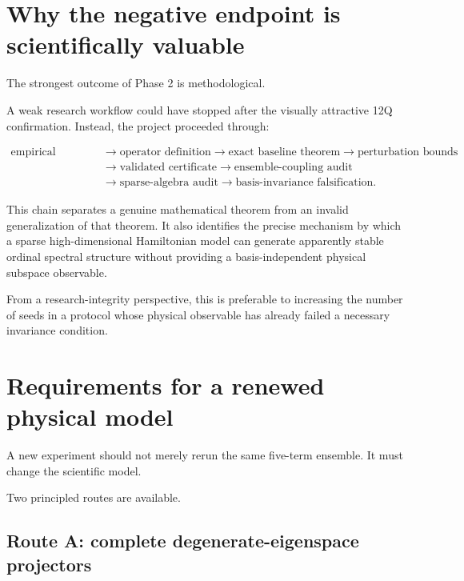 \documentclass[11pt,a4paper]{article}
\begin{document}
\section{Why the negative endpoint is scientifically valuable}

The strongest outcome of Phase 2 is methodological.

A weak research workflow could have stopped after the visually attractive
12Q confirmation.  Instead, the project proceeded through:

\[
\begin{aligned}
\text{empirical recurrence}
&\to \text{operator definition}
\to \text{exact baseline theorem}
\to \text{perturbation bounds}\\
&\to \text{validated certificate}
\to \text{ensemble-coupling audit}\\
&\to \text{sparse-algebra audit}
\to \text{basis-invariance falsification}.
\end{aligned}
\]

This chain separates a genuine mathematical theorem from an invalid
generalization of that theorem.  It also identifies the precise mechanism by
which a sparse high-dimensional Hamiltonian model can generate apparently
stable ordinal spectral structure without providing a basis-independent
physical subspace observable.

From a research-integrity perspective, this is preferable to increasing the
number of seeds in a protocol whose physical observable has already failed a
necessary invariance condition.

\section{Requirements for a renewed physical model}

A new experiment should not merely rerun the same five-term ensemble.
It must change the scientific model.

Two principled routes are available.

\subsection{Route A: complete degenerate-eigenspace projectors}
\end{document}

